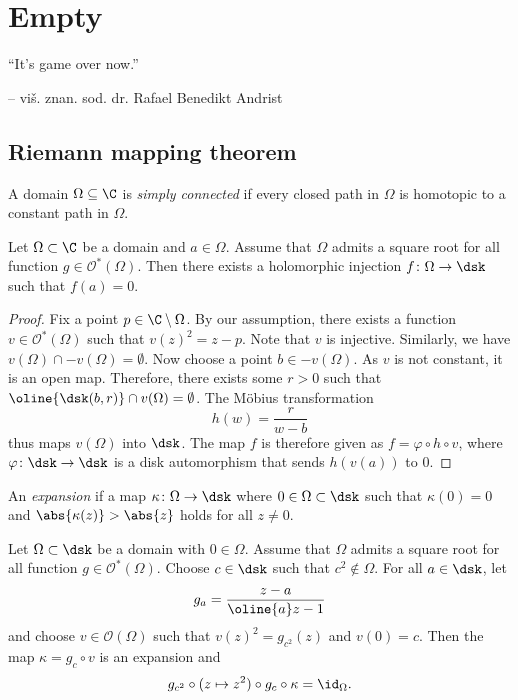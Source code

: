 
\section{Empty}

\epigraph{``It's game over now.''}{-- viš. znan. sod. dr. Rafael
Benedikt Andrist}

\subsection{Riemann mapping theorem}


\begin{definicija}
A domain $\Omega \subseteq \C$ is
\emph{simply connected} if every closed
path in $\Omega$ is homotopic to a constant path in $\Omega$.
\end{definicija}

\begin{lema}
\label{thm_hol:lm:inj_exis}
Let $\Omega \subset \C$ be a domain and $a \in \Omega$. Assume that
$\Omega$ admits a square root for all function
$g \in \mathcal{O}^*(\Omega)$. Then there exists a holomorphic
injection $f \colon \Omega \to \dsk$ such that $f(a) = 0$.
\end{lema}

\begin{proof}
Fix a point $p \in \C \setminus \Omega$. By our assumption, there
exists a function $v \in \mathcal{O}^*(\Omega)$ such that
$v(z)^2 = z-p$. Note that $v$ is injective. Similarly, we have
$v(\Omega) \cap -v(\Omega) = \emptyset$. Now choose a point
$b \in -v(\Omega)$. As $v$ is not constant, it is an open map.
Therefore, there exists some $r > 0 $ such that
$\oline{\dsk(b, r)} \cap v(\Omega) = \emptyset$. The Möbius
transformation
\[
h(w) = \frac{r}{w-b}
\]
thus maps $v(\Omega)$ into $\dsk$. The map $f$ is therefore given
as $f = \varphi \circ h \circ v$, where
$\varphi \colon \dsk \to \dsk$ is a disk automorphism that sends
$h(v(a))$ to $0$.
\end{proof}

\begin{definicija}
An \emph{expansion} if a map
$\kappa \colon \Omega \to \dsk$ where $0 \in \Omega \subset \dsk$
such that $\kappa(0) = 0$ and $\abs{\kappa(z)} > \abs{z}$ holds for
all $z \ne 0$.
\end{definicija}

\begin{lema}
Let $\Omega \subset \dsk$ be a domain with $0 \in \Omega$. Assume
that $\Omega$ admits a square root for all function
$g \in \mathcal{O}^*(\Omega)$. Choose $c \in \dsk$ such that
$c^2 \not \in \Omega$. For all $a \in \dsk$, let
\[
g_a = \frac{z - a}{\oline{a} z - 1}
\]
and choose $v \in \mathcal{O}(\Omega)$ such that
$v(z)^2 = g_{c^2}(z)$ and $v(0) = c$. Then the map
$\kappa = g_c \circ v$ is an expansion and
\[
g_{c^2} \circ (z \mapsto z^2) \circ g_c \circ \kappa =
\id_{\Omega}.
\]
\end{lema}

